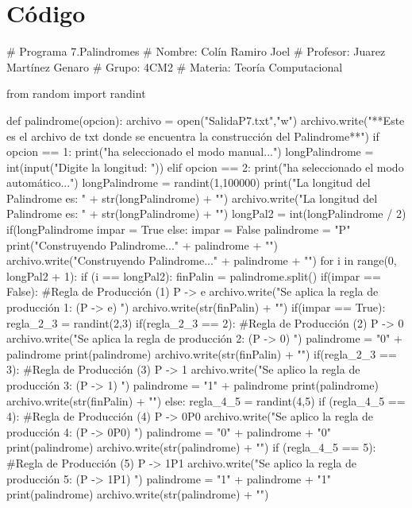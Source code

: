 \documentclass{article}
\begin{document}
	\section*{Código}
	\begin{python}
		# Programa 7.Palindromes
		# Nombre: Colín Ramiro Joel
		# Profesor: Juarez Martínez Genaro
		# Grupo: 4CM2
		# Materia: Teoría Computacional
		
		from random import randint
		
		def palindrome(opcion):
			archivo = open("SalidaP7.txt","w")
			archivo.write("**Este es el archivo de txt donde se encuentra la construcción del Palindrome**\n\n")
			if opcion == 1:
				print("\nSe ha seleccionado el modo manual...")
				longPalindrome = int(input("Digite la longitud: "))
			elif opcion == 2:
				print("\nSe ha seleccionado el modo automático...")
				longPalindrome = randint(1,100000)
			print("La longitud del Palindrome es: " + str(longPalindrome) + "\n")
			archivo.write("La longitud del Palindrome es: " + str(longPalindrome) + "\n")
			longPal2 = int(longPalindrome / 2)
			if(longPalindrome %
				impar = True		        
			else:
				impar = False
			palindrome = "P"
			print("Construyendo Palindrome...\n" + palindrome + "\n")
			archivo.write("Construyendo Palindrome...\n" + palindrome + "\n")			
			for i in range(0, longPal2 + 1):
				if (i == longPal2):
					finPalin = palindrome.split()
					if(impar == False): #Regla de Producción (1) P -> e
						archivo.write("Se aplica la regla de producción 1: (P -> e)  ")
						archivo.write(str(finPalin) + "\n")
					if(impar == True): 
						regla_2_3 = randint(2,3)            
						if(regla_2_3 == 2): #Regla de Producción (2) P -> 0
							archivo.write("Se aplica la regla de producción 2: (P -> 0)  ")
							palindrome = "0" + palindrome                    
							print(palindrome)
							archivo.write(str(finPalin) + "\n")    			
						if(regla_2_3 == 3): #Regla de Producción (3) P -> 1
							archivo.write("Se aplico la regla de producción 3: (P -> 1)  ")
							palindrome =  "1" + palindrome
							print(palindrome)
							archivo.write(str(finPalin) + "\n")
				else:
					regla_4_5 = randint(4,5)
					if (regla_4_5 == 4): #Regla de Producción (4) P -> 0P0
						archivo.write("Se aplico la regla de producción 4: (P -> 0P0)  ")
						palindrome = "0" + palindrome + "0"
						print(palindrome)						
						archivo.write(str(palindrome) + "\n")
					if (regla_4_5 == 5): #Regla de Producción (5) P -> 1P1
						archivo.write("Se aplico la regla de producción 5: (P -> 1P1)  ")
						palindrome = "1" + palindrome + "1"
						print(palindrome)
						archivo.write(str(palindrome) + "\n")
			      

\end{python}
\end{document}
